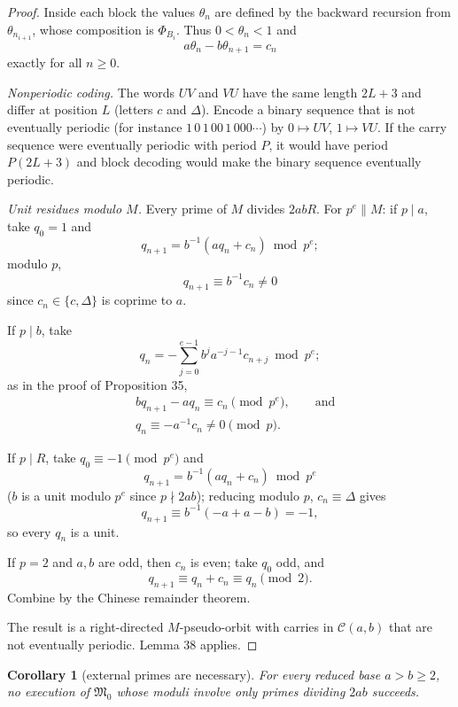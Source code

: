 \documentclass[11pt,reqno]{amsart}
\newtheorem{corollary}[theorem]{Corollary}
\theoremstyle{definition}
\theoremstyle{remark}
\begin{document}
\begin{proof}
Inside each block the values \(\theta_n\) are defined
by the backward recursion from \(\theta_{n_{i+1}}\), whose composition is
\(\Phi_{B_i}\). Thus \(0<\theta_n<1\) and
\[
a\theta_n-b\theta_{n+1}=c_n
\]
exactly for all \(n\ge0\).

\emph{Nonperiodic coding.} The words \(UV\) and \(VU\) have the same length
\(2L+3\) and differ at position \(L\) (letters \(c\) and \(\Delta\)).
Encode a binary sequence that is not eventually periodic (for instance
\(1\,0\,1\,00\,1\,000\cdots\)) by \(0\mapsto UV\), \(1\mapsto VU\). If
the carry sequence were eventually periodic with period \(P\), it would
have period \(P(2L+3)\) and block decoding would make the binary
sequence eventually periodic.

\emph{Unit residues modulo \(M\).} Every prime of \(M\) divides \(2abR\). For
\(p^e\parallel M\): if \(p\mid a\), take \(q_0=1\) and
\[
q_{n+1}=b^{-1}(aq_n+c_n)\bmod p^e;
\]
modulo \(p\),
\[
q_{n+1}\equiv b^{-1}c_n\ne0
\]
since \(c_n\in\{c,\Delta\}\) is coprime
to \(a\).

If \(p\mid b\), take
\[
q_n=-\sum_{j=0}^{e-1}b^ja^{-j-1}c_{n+j}\bmod p^e;
\]
as in the proof of
Proposition 35,
\[
\begin{aligned}
&bq_{n+1}-aq_n\equiv c_n\pmod{p^e},\qquad\text{and}\\
&q_n\equiv-a^{-1}c_n\ne0\pmod p.
\end{aligned}
\]

If \(p\mid R\), take
\(q_0\equiv-1\pmod{p^e}\) and
\[
q_{n+1}=b^{-1}(aq_n+c_n)\bmod p^e
\]
(\(b\) is a unit modulo \(p^e\) since \(p\nmid2ab\)); reducing modulo
\(p\), \(c_n\equiv\Delta\) gives
\[
q_{n+1}\equiv b^{-1}(-a+a-b)=-1,
\]
so every \(q_n\) is a unit.

If \(p=2\) and \(a,b\) are odd,
then \(c_n\) is even; take \(q_0\) odd, and
\[
q_{n+1}\equiv q_n+c_n\equiv q_n\pmod2.
\]
Combine by the Chinese
remainder theorem.

The result is a right-directed \(M\)-pseudo-orbit with carries in
\(\mathcal C(a,b)\) that are not eventually periodic. Lemma 38
applies. \qedhere
\end{proof}

\begin{samepage}
\begin{corollary}[external primes are necessary]\leavevmode\label{thm:43}
For every reduced base
\(a>b\ge2\), no execution of \(\mathfrak M_0\) whose moduli involve only
primes dividing \(2ab\) succeeds.
\label{thm-end:43}
\end{corollary}
\end{samepage}
\end{document}
